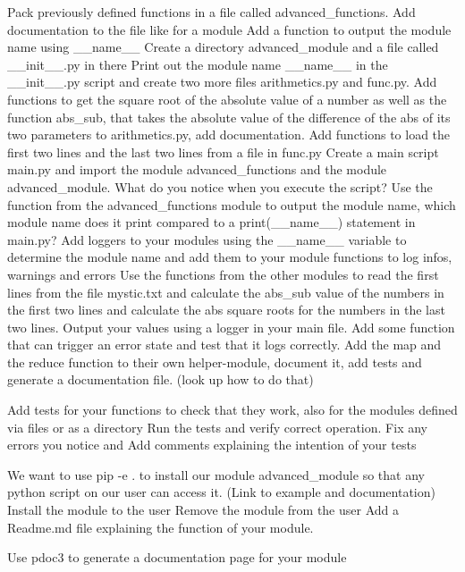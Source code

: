 \documentclass[]{erlangen-problemset}
\begin{document}
\begin{problem}[title={Using files and directories as modules}]
\noindent
\Question Pack previously defined functions in a file called advanced_functions.
\Question Add documentation to the file like for a module 
\Question Add a function to output the module name using \_\_name\_\_
\Question Create a directory advanced\_module and a file called \_\_init\_\_.py in there
\Question Print out the module name \_\_name\_\_ in the \_\_init\_\_.py script and create two more files arithmetics.py and func.py. 
Add functions to get the square root of the absolute value of a number as well as the function abs\_sub, that takes the absolute value of the difference of the abs of its two parameters to arithmetics.py, add documentation. 
Add functions to load the first two lines and the last two lines from a file in func.py
\Question Create a main script main.py and import the module advanced_functions and the module advanced_module. 
What do you notice when you execute the script? 
\Question Use the function from the advanced\_functions module to output the module name, which module name does it print compared to a print(\_\_name\_\_) statement in main.py?
\Question Add loggers to your modules using the \_\_name\_\_ variable to determine the module name and add them to your module functions to log infos, warnings and errors
\Question Use the functions from the other modules to read the first lines from the file mystic.txt and calculate the abs\_sub value of the numbers in the first two lines and calculate the abs square roots for the numbers in the last two lines. Output your values using a logger in your main file. 
\Question Add some function that can trigger an error state and test that it logs correctly. 
\Question Add the map and the reduce function to their own helper-module, document it, add tests and generate a documentation file. (look up how to do that)
\end{problem}


\begin{problem}[title={Building tests for our modules}]
\noindent
\Question Add tests for your functions to check that they work, also for the modules defined via files or as a directory
\Question Run the tests and verify correct operation. Fix any errors you notice and Add comments explaining the intention of your tests
\end{problem}

\begin{problem}[title={Making our module installable with pip}]
\noindent
\Question We want to use pip -e . to install our module advanced\_module so that any python script on our user can access it. (Link to example and documentation)
\Question Install the module to the user
\Question Remove the module from the user
\Question Add a Readme.md file explaining the function of your module.
\end{problem}

\begin{problem}[title={Generating documentation for your module}]
\noindent
\Question Use pdoc3 to generate a documentation page for your module
\end{problem}
\end{document}
